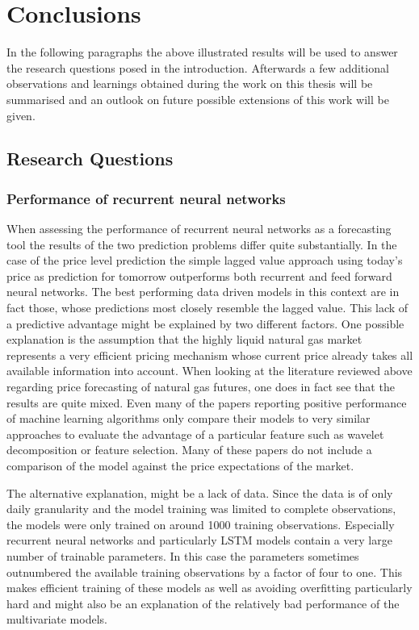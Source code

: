\chapter{Conclusions}\label{Sec:Conc}
In the following paragraphs the above illustrated results will be used to answer the research questions posed in the introduction. Afterwards a few additional observations and learnings obtained during the work on this thesis will be summarised and an outlook on future possible extensions of this work will be given.
\section{Research Questions}
\subsection{Performance of recurrent neural networks}
When assessing the performance of recurrent neural networks as a forecasting tool the results of the two prediction problems differ quite substantially. In the case of the price level prediction the simple lagged value approach using today's price as prediction for tomorrow outperforms both recurrent and feed forward neural networks. The best performing data driven models in this context are in fact those, whose predictions most closely resemble the lagged value. This lack of a predictive advantage might be explained by two different factors. One possible explanation is the assumption that the highly liquid natural gas market represents a very efficient pricing mechanism whose current price already takes all available information into account. When looking at the literature reviewed above regarding price forecasting of natural gas futures, one does in fact see that the results are quite mixed. Even many of the papers reporting positive performance of machine learning algorithms only compare their models to very similar approaches to evaluate the advantage of a particular feature such as wavelet decomposition or feature selection. Many of these papers do not include a comparison of the model against the price expectations of the market.

The alternative explanation, might be a lack of data. Since the data is of only daily granularity and the model training was limited to complete observations, the models were only trained on around 1000 training observations. Especially recurrent neural networks and particularly LSTM models contain a very large number of trainable parameters. In this case the parameters sometimes outnumbered the available training observations by a factor of four to one. This makes efficient training of these models as well as avoiding overfitting particularly hard and might also be an explanation of the relatively bad performance of the multivariate models. 

